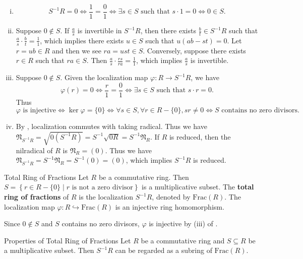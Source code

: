 \begin{prf}
    \begin{enumerate}[(i)]
        \item \[
            S^{-1}R=0\iff \frac{1}{1}=\frac{0}{1}\iff \exists s\in S\text{ such that }s\cdot 1=0\iff 0\in S.
            \]
        \item Suppose $0\notin S$. If $\frac{a}{s}$ is invertible in $S^{-1}R$, then there exists $\frac{b}{t}\in S^{-1}R$ such that $\frac{a}{s}\cdot\frac{b}{t}=\frac{1}{1}$, which implies there exists $u\in S$ such that $u(ab-st)=0$. Let $r=ub\in R$ and then we see $ra=ust\in S$. Conversely, suppose there exists $r\in R$ such that $ra\in S$. Then $\frac{a}{s}\cdot\frac{rs}{ra}=\frac{1}{1}$, which implies $\frac{a}{s}$ is invertible.
        \item Suppose $0\notin S$. Given the localization map $\varphi:R\to S^{-1}R$, we have
        \[
            \varphi(r)=0\iff \frac{r}{1}=\frac{0}{1}\iff \exists s\in S\text{ such that }s\cdot r=0.
        \]
        Thus 
        $$
        \varphi\text{ is injective}\iff \ker \varphi=\{0\}\iff \forall s\in S,\forall r\in R-\{0\},sr\ne 0\iff S\text{ contains no zero divisors}.
        $$
        \item By , localization commutes with taking radical. Thus we have $\mathfrak{N}_{S^{-1}R}=\sqrt{0(S^{-1}R)}=S^{-1}\sqrt{0R}=S^{-1}\mathfrak{N}_R$. If $R$ is reduced, then the nilradical of $R$ is $\mathfrak{N}_R=(0)$. Thus we have $\mathfrak{N}_{S^{-1}R}=S^{-1}\mathfrak{N}_R=S^{-1}(0)=(0)$, which implies $S^{-1}R$ is reduced.
    \end{enumerate}
\end{prf}


\begin{definition}{Total Ring of Fractions}{}
    Let $R$ be a commutative ring. Then $S=\left\{r\in R-\{0\}\mid r\text{ is not a zero divisor}\right\}$ is a multiplicative subset. The \textbf{total ring of fractions} of $R$ is the localization $S^{-1}R$, denoted by $\mathrm{Frac}(R)$. The localization map $\varphi:R\hookrightarrow \mathrm{Frac}(R)$ is an injective ring homomorphism.
\end{definition}

\begin{prf}
    Since $0\notin S$ and $S$ contains no zero divisors, $\varphi$ is injective by (iii) of .
\end{prf}

\begin{proposition}{Properties of Total Ring of Fractions}{}
    Let $R$ be a commutative ring and $S\subseteq R$ be a multiplicative subset. Then $S^{-1}R$ can be regarded as a subring of $\mathrm{Frac}(R)$. 
\end{proposition}

